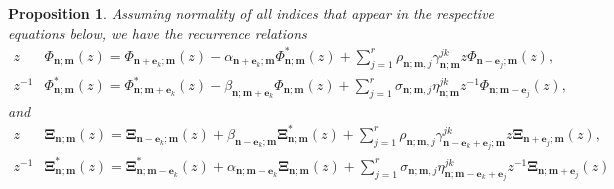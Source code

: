 \documentclass[reqno,centertags,11pt,draft]{amsart}
\newtheorem{prop}[thm]{Proposition}
\newcommand{\red}[1]{{\color{red}#1}}
\begin{document}
%
%    

\begin{prop} Assuming normality of all indices that appear in the respective equations below, %
we have the recurrence relations
    \begin{align}
        \label{eq:SzegoII9}
         z&\Phi_{\bm{n};\bm{m}}(z) = \Phi_{\bm{n}+\bm{e}_k;\bm{m}}(z) - \alpha_{\bm{n}+\bm{e}_k;\bm{m}}\Phi_{\bm{n};\bm{m}}^*(z) + \sum_{j = 1}^r \rho_{\bm{n};\bm{m},j}\gamma_{\bm{n};\bm{m}}^{jk}z\Phi_{\bm{n}-\bm{e}_j;\bm{m}}(z), \\
        \label{eq:SzegoII10}
         z^{-1}&\Phi_{\bm{n};\bm{m}}^*(z) = \Phi_{\bm{n};\bm{m}+\bm{e}_k}^*(z) - \beta_{\bm{n};\bm{m}+\bm{e}_k}\Phi_{\bm{n};\bm{m}}(z) + \sum_{j = 1}^r \sigma_{\bm{n};\bm{m},j}\eta_{\bm{n};\bm{m}}^{jk}z^{-1}\Phi_{\bm{n};\bm{m}-\bm{e}_j}(z),
    \end{align}
    and 
    \begin{align*}
        z &\bm{\Xi}_{\bm{n};\bm{m}}(z) = \bm{\Xi}_{\bm{n}-\bm{e}_k;\bm{m}}(z) + \beta_{\bm{n}-\bm{e}_k;\bm{m}}\bm{\Xi}_{\bm{n};\bm{m}}^*(z) + \sum_{j=1}^r \rho_{\bm{n};\bm{m},j}\gamma_{\bm{n}-\bm{e}_k+\bm{e}_j;\bm{m}}^{jk}z\bm{\Xi}_{\bm{n}+\bm{e}_j;\bm{m}}(z),\\
        z^{-1}&\bm{\Xi}_{\bm{n};\bm{m}}^*(z) = \bm{\Xi}_{\bm{n};\bm{m}-\bm{e}_k}^*(z) + \alpha_{\bm{n};\bm{m}-\bm{e}_k}\bm{\Xi}_{\bm{n};\bm{m}}(z)+\sum_{j=1}^r \sigma_{\bm{n};\bm{m},j}\eta_{\bm{n};\bm{m}-\bm{e}_k+\bm{e}_j}^{jk}z^{-1}\bm{\Xi}_{\bm{n};\bm{m}+\bm{e}_j}(z)
    \end{align*}
\end{prop}
\end{document}
